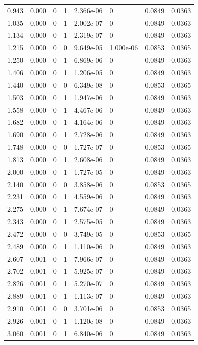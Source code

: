 \documentclass[preview]{standalone}
\begin{document}
{{\begin{tabular}{L{1.2cm}C{1.2cm} C{0.3cm}C{0.5cm} C{1.4cm}C{1.4cm} C{1.4cm}C{1.4cm}}
  0.943  &  0.000  & 0     &  1 &  2.366e-06  & 0  & 0.0849 &  0.0363   \\ 
  1.035  &  0.000  & 0     &  1 &  2.002e-07  & 0  & 0.0849 &  0.0363   \\ 
  1.134  &  0.000  & 0     &  1 &  2.319e-07  & 0  & 0.0849 &  0.0363   \\ 
  1.215  &  0.000  & 0     &  0 &  9.649e-05  & 1.000e-06  & 0.0853 &  0.0365   \\ 
  1.250  &  0.000  & 0     &  1 &  6.869e-06  & 0  & 0.0849 &  0.0363   \\ 
  1.406  &  0.000  & 0     &  1 &  1.206e-05  & 0  & 0.0849 &  0.0363   \\ 
  1.440  &  0.000  & 0     &  0 &  6.349e-08  & 0  & 0.0853 &  0.0365   \\ 
  1.503  &  0.000  & 0     &  1 &  1.947e-06  & 0  & 0.0849 &  0.0363   \\ 
  1.558  &  0.000  & 0     &  1 &  4.467e-06  & 0  & 0.0849 &  0.0363   \\ 
  1.682  &  0.000  & 0     &  1 &  4.164e-06  & 0  & 0.0849 &  0.0363   \\ 
  1.690  &  0.000  & 0     &  1 &  2.728e-06  & 0  & 0.0849 &  0.0363   \\ 
  1.748  &  0.000  & 0     &  0 &  1.727e-07  & 0  & 0.0853 &  0.0365   \\ 
  1.813  &  0.000  & 0     &  1 &  2.608e-06  & 0  & 0.0849 &  0.0363   \\ 
  2.000  &  0.000  & 0     &  1 &  1.727e-05  & 0  & 0.0849 &  0.0363   \\ 
  2.140  &  0.000  & 0     &  0 &  3.858e-06  & 0  & 0.0853 &  0.0365   \\ 
  2.231  &  0.000  & 0     &  1 &  4.559e-06  & 0  & 0.0849 &  0.0363   \\ 
  2.275  &  0.000  & 0     &  1 &  7.674e-07  & 0  & 0.0849 &  0.0363   \\ 
  2.343  &  0.000  & 0     &  1 &  2.575e-05  & 0  & 0.0849 &  0.0363   \\ 
  2.472  &  0.000  & 0     &  0 &  3.749e-05  & 0  & 0.0853 &  0.0365   \\ 
  2.489  &  0.000  & 0     &  1 &  1.110e-06  & 0  & 0.0849 &  0.0363   \\ 
  2.607  &  0.001  & 0     &  1 &  7.966e-07  & 0  & 0.0849 &  0.0363   \\ 
  2.702  &  0.001  & 0     &  1 &  5.925e-07  & 0  & 0.0849 &  0.0363   \\ 
  2.826  &  0.001  & 0     &  1 &  5.270e-07  & 0  & 0.0849 &  0.0363   \\ 
  2.889  &  0.001  & 0     &  1 &  1.113e-07  & 0  & 0.0849 &  0.0363   \\ 
  2.910  &  0.001  & 0     &  0 &  3.701e-06  & 0  & 0.0853 &  0.0365   \\ 
  2.926  &  0.001  & 0     &  1 &  1.120e-08  & 0  & 0.0849 &  0.0363   \\ 
  3.060  &  0.001  & 0     &  1 &  6.840e-06  & 0  & 0.0849 &  0.0363   \\ 
\hline 
\end{tabular} 

}}
\end{document}
